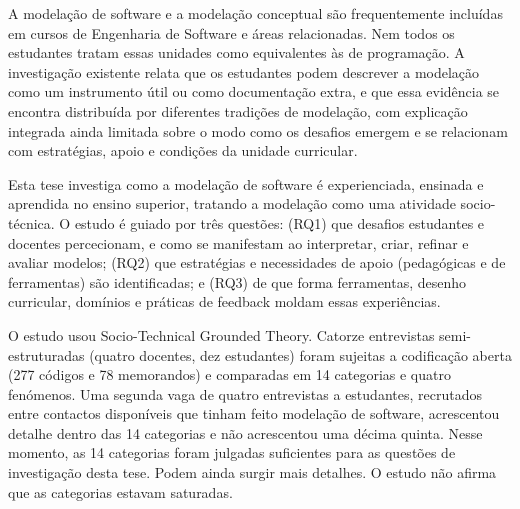 
%

A modelação de software e a modelação conceptual são frequentemente incluídas em cursos de Engenharia de Software e áreas relacionadas. Nem todos os estudantes tratam essas unidades como equivalentes às de programação. A investigação existente relata que os estudantes podem descrever a modelação como um instrumento útil ou como documentação extra, e que essa evidência se encontra distribuída por diferentes tradições de modelação, com explicação integrada ainda limitada sobre o modo como os desafios emergem e se relacionam com estratégias, apoio e condições da unidade curricular.

Esta tese investiga como a modelação de software é experienciada, ensinada e aprendida no ensino superior, tratando a modelação como uma atividade socio-técnica. O estudo é guiado por três questões: (RQ1) que desafios estudantes e docentes percecionam, e como se manifestam ao interpretar, criar, refinar e avaliar modelos; (RQ2) que estratégias e necessidades de apoio (pedagógicas e de ferramentas) são identificadas; e (RQ3) de que forma ferramentas, desenho curricular, domínios e práticas de feedback moldam essas experiências.

O estudo usou Socio-Technical Grounded Theory. Catorze entrevistas semi-estruturadas (quatro docentes, dez estudantes) foram sujeitas a codificação aberta (277 códigos e 78 memorandos) e comparadas em 14 categorias e quatro fenómenos. Uma segunda vaga de quatro entrevistas a estudantes, recrutados entre contactos disponíveis que tinham feito modelação de software, acrescentou detalhe dentro das 14 categorias e não acrescentou uma décima quinta. Nesse momento, as 14 categorias foram julgadas suficientes para as questões de investigação desta tese. Podem ainda surgir mais detalhes. O estudo não afirma que as categorias estavam saturadas.

